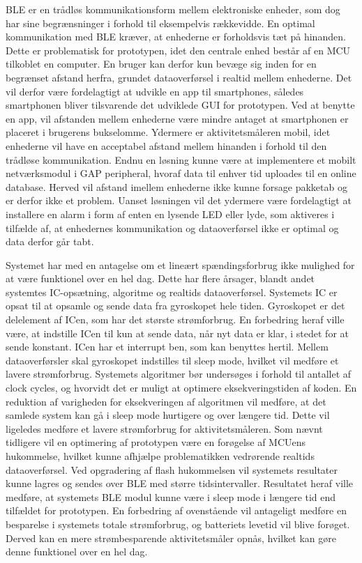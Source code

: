 BLE er en trådløs kommunikationsform mellem elektroniske enheder, som dog har sine begrænsninger i forhold til eksempelvis rækkevidde. En optimal kommunikation med BLE kræver, at enhederne er forholdsvis tæt på hinanden. Dette er problematisk for prototypen, idet den centrale enhed består af en MCU tilkoblet en computer. En bruger kan derfor kun bevæge sig inden for en begrænset afstand herfra, grundet dataoverførsel i realtid mellem enhederne. Det vil derfor være fordelagtigt at udvikle en app til smartphones, således smartphonen bliver tilsvarende det udviklede GUI for prototypen. Ved at benytte en app, vil afstanden mellem enhederne være mindre antaget at smartphonen er placeret i brugerens bukselomme. Ydermere er aktivitetsmåleren mobil, idet enhederne vil have en acceptabel afstand mellem hinanden i forhold til den trådløse kommunikation. Endnu en løsning kunne være at implementere et mobilt netværksmodul i GAP peripheral, hvoraf data til enhver tid uploades til en online database. Herved vil afstand imellem enhederne ikke kunne forsage pakketab og er derfor ikke et problem. Uanset løsningen vil det ydermere være fordelagtigt at installere en alarm i form af enten en lysende LED eller lyde, som aktiveres i tilfælde af, at enhedernes kommunikation og dataoverførsel ikke er optimal og data derfor går tabt. 

Systemet har med en antagelse om et lineært spændingsforbrug ikke mulighed for at være funktionel over en hel dag. Dette har flere årsager, blandt andet systemtes IC-opsætning, algoritme og realtids dataoverførsel. Systemets IC er opsat til at opsamle og sende data fra gyroskopet hele tiden. Gyroskopet er det delelement af ICen, som har det største strømforbrug. En forbedring heraf ville være, at indstille ICen til kun at sende data, når nyt data er klar, i stedet for at sende konstant. ICen har et interrupt ben, som kan benyttes hertil. Mellem dataoverførsler skal gyroskopet indstilles til sleep mode, hvilket vil medføre et lavere strømforbrug. Systemets algoritmer bør undersøges i forhold til antallet af clock cycles, og hvorvidt det er muligt at optimere eksekveringstiden af koden. En reduktion af varigheden for eksekveringen af algoritmen vil medføre, at det samlede system kan gå i sleep mode hurtigere og over længere tid. Dette vil ligeledes medføre et lavere strømforbrug for aktivitetsmåleren. Som nævnt tidligere vil en optimering af prototypen være en forøgelse af MCUens hukommelse, hvilket kunne afhjælpe problematikken vedrørende realtids dataoverførsel. Ved opgradering af flash hukommelsen vil systemets resultater kunne lagres og sendes over BLE med større tidsintervaller. Resultatet heraf ville medføre, at systemets BLE modul kunne være i sleep mode i længere tid end tilfældet for prototypen. En forbedring af ovenstående vil antageligt medføre en besparelse i systemets totale strømforbrug, og batteriets levetid vil blive forøget. Derved kan en mere strømbesparende aktivitetsmåler opnås, hvilket kan gøre denne funktionel over en hel dag.

